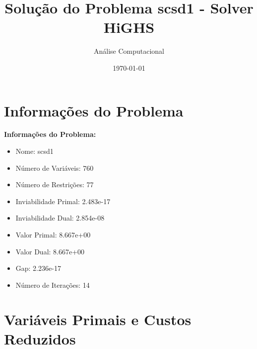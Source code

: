 \documentclass[12pt]{article}
\title{Solução do Problema scsd1 - Solver HiGHS}
\author{Análise Computacional}
\date{\today}
\begin{document}
\maketitle

\section{Informações do Problema}

\textbf{Informações do Problema:}
\begin{itemize}
\item Nome: scsd1
\item Número de Variáveis: 760
\item Número de Restrições: 77
\item Inviabilidade Primal: 2.483e-17
\item Inviabilidade Dual: 2.854e-08
\item Valor Primal: 8.667e+00
\item Valor Dual: 8.667e+00
\item Gap: 2.236e-17
\item Número de Iterações: 14
\end{itemize}


\section{Variáveis Primais e Custos Reduzidos}
\end{document}
